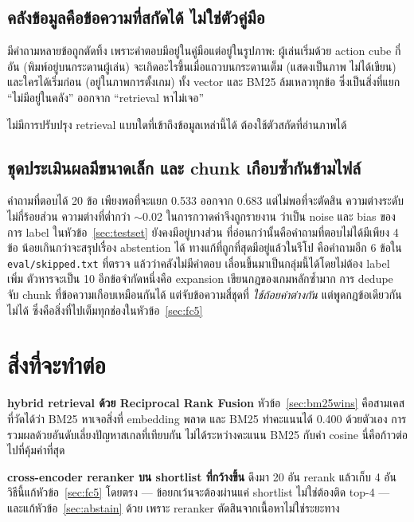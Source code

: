 \documentclass[11pt,a4paper]{article}
\newcommand{\code}[1]{\texttt{\small #1}}
\begin{document}
\subsection{คลังข้อมูลคือข้อความที่สกัดได้ ไม่ใช่ตัวคู่มือ}
\label{sec:pictures}

มีคำถามหลายข้อถูกตัดทิ้ง เพราะคำตอบมีอยู่ในคู่มือแต่อยู่ในรูปภาพ:
ผู้เล่นเริ่มด้วย action cube กี่อัน (พิมพ์อยู่บนกระดานผู้เล่น)
จะเกิดอะไรขึ้นเมื่อแถวบนกระดานเต็ม (แสดงเป็นภาพ ไม่ได้เขียน)
และใครได้เริ่มก่อน (อยู่ในภาพการตั้งเกม)
ทั้ง vector และ BM25 ล้มเหลวทุกข้อ ซึ่งเป็นสิ่งที่แยก
“ไม่มีอยู่ในคลัง” ออกจาก “retrieval หาไม่เจอ”

ไม่มีการปรับปรุง retrieval แบบใดที่เข้าถึงข้อมูลเหล่านี้ได้ ต้องใช้ตัวสกัดที่อ่านภาพได้

\subsection{ชุดประเมินผลมีขนาดเล็ก และ chunk เกือบซ้ำกันข้ามไฟล์}

คำถามที่ตอบได้ 20 ข้อ เพียงพอที่จะแยก 0.533 ออกจาก 0.683 แต่ไม่พอที่จะตัดสิน
ความต่างระดับไม่กี่ร้อยส่วน ความต่างที่ต่ำกว่า $\sim$0.02 ในการกวาดค่าจึงถูกรายงาน
ว่าเป็น noise และ bias ของการ label ในหัวข้อ~\ref{sec:testset} ยังคงมีอยู่บางส่วน
ที่อ่อนกว่านั้นคือคำถามที่ตอบไม่ได้มีเพียง 4 ข้อ น้อยเกินกว่าจะสรุปเรื่อง abstention ได้
ทางแก้ที่ถูกที่สุดมีอยู่แล้วในรีโป คือคำถามอีก 6 ข้อใน \code{eval/skipped.txt} ที่ตรวจ
แล้วว่าคลังไม่มีคำตอบ เลื่อนขึ้นมาเป็นกลุ่มนี้ได้โดยไม่ต้อง label เพิ่ม ตัวหารจะเป็น 10
อีกข้อจำกัดหนึ่งคือ expansion เขียนกฎของเกมหลักซ้ำมาก การ dedupe จับ chunk
ที่ข้อความเกือบเหมือนกันได้ แต่จับข้อความสี่ชุดที่ \emph{ใช้ถ้อยคำต่างกัน}
แต่พูดกฎข้อเดียวกันไม่ได้ ซึ่งคือสิ่งที่ไปเต็มทุกช่องในหัวข้อ~\ref{sec:fc5}

\section{สิ่งที่จะทำต่อ}

\textbf{hybrid retrieval ด้วย Reciprocal Rank Fusion}\quad
หัวข้อ~\ref{sec:bm25wins} คือสามเคสที่วัดได้ว่า BM25 หาเจอสิ่งที่ embedding พลาด
และ BM25 ทำคะแนนได้ 0.400 ด้วยตัวเอง การรวมผลด้วยอันดับเลี่ยงปัญหาสเกลที่เทียบกัน
ไม่ได้ระหว่างคะแนน BM25 กับค่า cosine นี่คือก้าวต่อไปที่คุ้มค่าที่สุด

\textbf{cross-encoder reranker บน shortlist ที่กว้างขึ้น}\quad
ดึงมา 20 อัน rerank แล้วเก็บ 4 อัน วิธีนี้แก้หัวข้อ~\ref{sec:fc5} โดยตรง ---
ข้อยกเว้นจะต้องผ่านแค่ shortlist ไม่ใช่ต้องติด top-4 ---
และแก้หัวข้อ~\ref{sec:abstain} ด้วย เพราะ reranker ตัดสินจากเนื้อหาไม่ใช่ระยะทาง
\end{document}
